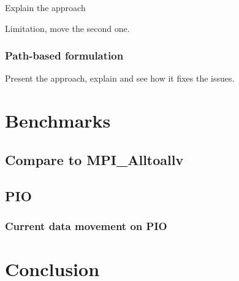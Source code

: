 \documentclass[letter]{article}
\begin{document}
Explain the approach

Limitation, move the second one.

\subsubsection{Path-based formulation}
Present the approach, explain and see how it fixes the issues.

\section{Benchmarks}
\subsection{Compare to MPI\_Alltoallv}

\subsection{PIO}

\subsubsection{Current data movement on PIO}

\subsubsection{}

\section{Conclusion}
\end{document}
